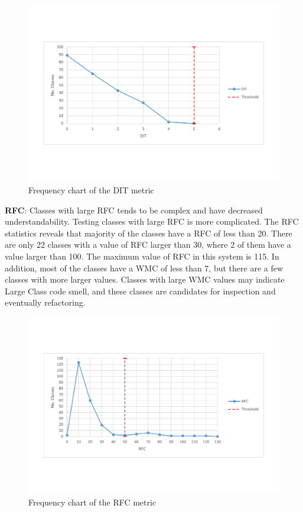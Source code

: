 \begin{figure}
	\centering
	\includegraphics[width=\textwidth]{images/threshold/dit.pdf}
	\caption{Frequency chart of the DIT metric}
	\label{fig:ditdistribution}
\end{figure}


\textbf{RFC}: Classes with large RFC tends to be complex and have decreased understandability. Testing classes with large RFC is more complicated. The RFC statistics reveals that majority of the classes have a RFC of less than 20. There are only 22 classes with a value of RFC larger than 30, where 2 of them have a value larger than 100. The maximum value of RFC in this system is 115. In addition, most of the classes have a WMC of less than 7, but there are a few classes with more larger values. Classes with large WMC values may indicate Large Class code smell, and these classes are candidates for inspection and eventually refactoring. 

\begin{figure}
	\centering
	\includegraphics[width=\textwidth]{images/threshold/rfc.pdf}
	\caption{Frequency chart of the RFC metric}
	\label{fig:rfcdistribution}
\end{figure}

